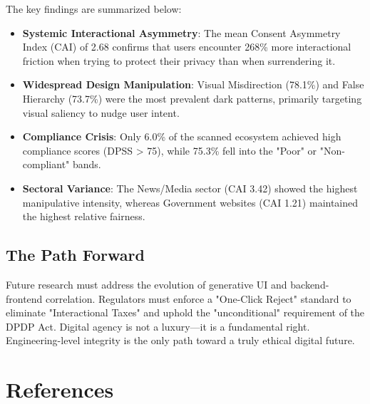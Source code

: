\documentclass[12pt,a4paper]{report}
\begin{document}
The key findings are summarized below:
\begin{itemize}[leftmargin=1.5cm]
    \item \textbf{Systemic Interactional Asymmetry}: The mean Consent Asymmetry Index (CAI) of 2.68 confirms that users encounter 268\% more interactional friction when trying to protect their privacy than when surrendering it.
    \item \textbf{Widespread Design Manipulation}: Visual Misdirection (78.1\%) and False Hierarchy (73.7\%) were the most prevalent dark patterns, primarily targeting visual saliency to nudge user intent.
    \item \textbf{Compliance Crisis}: Only 6.0\% of the scanned ecosystem achieved high compliance scores (DPSS > 75), while 75.3\% fell into the "Poor" or "Non-compliant" bands.
    \item \textbf{Sectoral Variance}: The News/Media sector (CAI 3.42) showed the highest manipulative intensity, whereas Government websites (CAI 1.21) maintained the highest relative fairness.
\end{itemize}

\section{The Path Forward}
Future research must address the evolution of generative UI and backend-frontend correlation. Regulators must enforce a "One-Click Reject" standard to eliminate "Interactional Taxes" and uphold the "unconditional" requirement of the DPDP Act. Digital agency is not a luxury—it is a fundamental right. Engineering-level integrity is the only path toward a truly ethical digital future.

\newpage

\chapter*{References}
\end{document}
